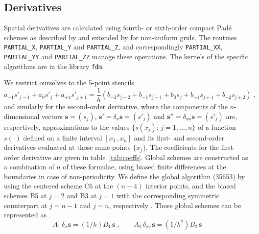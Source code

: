\subsection{Derivatives}\label{sec:fdm}

Spatial derivatives are calculated using fourth- or sixth-order compact Pad\'{e} schemes as described by \cite{Lele:1992} and extended by \cite{Shukla:2005} for non-uniform grids. The routines {\tt PARTIAL\_X}, {\tt PARTIAL\_Y} and {\tt   PARTIAL\_Z}, and correspondingly {\tt PARTIAL\_XX}, {\tt PARTIAL\_YY} and {\tt   PARTIAL\_ZZ} manage these operations. The kernels of the specific algorithms are in the library {\tt fdm}.

We restrict ourselves to the 5-point stencils
\begin{equation}
a_{-1}s'_{j-1}+a_{0}s'_{j}+a_{+1}s'_{j+1}=
\frac{1}{h}(b_{-2}s_{j-2}+b_{-1}s_{j-1}+b_{0}s_{j}+b_{+1}s_{j+1}+b_{+2}s_{j+2}) \;,
\label{equ:coefs}
\end{equation}
and similarly for the second-order derivative, where the components of the $n$-dimensional vectors $\mathbf{s}=(s_j)$, $\mathbf{s'}=\delta_x \mathbf{s}=(s'_j)$ and $\mathbf{s''}=\delta_{xx} \mathbf{s}=(s'_j)$ are, respectively, approximations to the values $\{s(x_j):\, j=1,\ldots,n\}$ of a function $s(\cdot)$ defined on a finite interval $[x_1\,,x_n]$ and its first- and second-order derivatives evaluated at those same points $\{x_j\}$. The coefficients for the first-order derivative are given in table~\ref{tab:coeffs}. Global schemes are constructed as a combination of $n$ of these formulae, using biased finite differences at the boundaries in case of non-periodicity.  We define the global algorithm (35653) by using the centered scheme C6 at the $(n-4)$ interior points, and the biased schemes B5 at $j=2$ and B3 at $j=1$ with the corresponding symmetric counterpart at $j=n-1$ and $j=n$, respectively \cite{Carpenter:1993}. Those global schemes can be represented as
\begin{equation}
  A_1\, \delta_x \mathbf{s}=(1/h)B_1\, \mathbf{s} \;, \qquad
  A_2\, \delta_{xx} \mathbf{s}=(1/h^2)B_2\, \mathbf{s}
\label{equ:fdm}
\end{equation}
